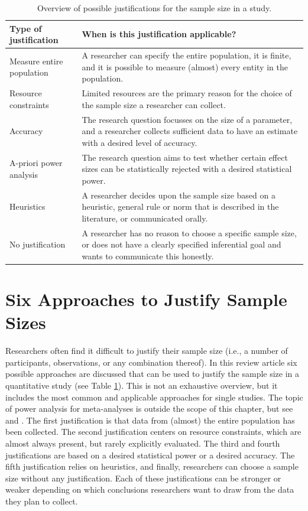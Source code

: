 \documentclass[
  oneside]{krantz}
\begin{document}
\begin{table}

\caption{\label{tab:table-pow-just}Overview of possible justifications for the sample size in a study.}
\centering
\begin{tabular}[t]{>{\raggedright\arraybackslash}p{5cm}>{\raggedright\arraybackslash}p{10cm}}
\toprule
Type of justification & When is this justification applicable?\\
\midrule
Measure entire population & A researcher can specify the entire population, it is finite, and it is possible to measure (almost) every entity in the population.\\
Resource constraints & Limited resources are the primary reason for the choice of the sample size a researcher can collect.\\
Accuracy & The research question focusses on the size of a parameter, and a researcher collects sufficient data to have an estimate with a desired level of accuracy.\\
A-priori power analysis & The research question aims to test whether certain effect sizes can be statistically rejected with a desired statistical power.\\
Heuristics & A researcher decides upon the sample size based on a heuristic, general rule or norm that is described in the literature, or communicated orally.\\
\addlinespace
No justification & A researcher has no reason to choose a specific sample size, or does not have a clearly specified inferential goal and wants to communicate this honestly.\\
\bottomrule
\end{tabular}
\end{table}

\hypertarget{six-approaches-to-justify-sample-sizes}{%
\section{Six Approaches to Justify Sample Sizes}\label{six-approaches-to-justify-sample-sizes}}

Researchers often find it difficult to justify their sample size (i.e., a number of participants, observations, or any combination thereof). In this review article six possible approaches are discussed that can be used to justify the sample size in a quantitative study (see Table \ref{tab:table-pow-just}). This is not an exhaustive overview, but it includes the most common and applicable approaches for single studies. The topic of power analysis for meta-analyses is outside the scope of this chapter, but see \citet{hedges_power_2001} and \citet{valentine_how_2010}. The first justification is that data from (almost) the entire population has been collected. The second justification centers on resource constraints, which are almost always present, but rarely explicitly evaluated. The third and fourth justifications are based on a desired statistical power or a desired accuracy. The fifth justification relies on heuristics, and finally, researchers can choose a sample size without any justification. Each of these justifications can be stronger or weaker depending on which conclusions researchers want to draw from the data they plan to collect.
\end{document}

